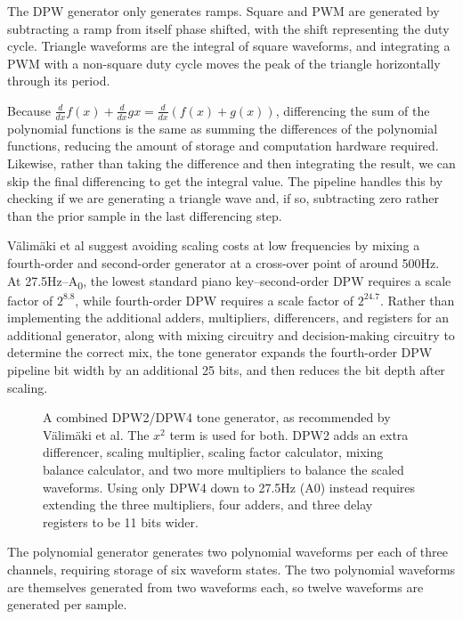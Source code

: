 The DPW generator only generates ramps.  Square and PWM are generated by subtracting a ramp from itself phase shifted, with the shift representing the duty cycle.  Triangle waveforms are the integral of square waveforms, and integrating a PWM with a non-square duty cycle moves the peak of the triangle horizontally through its period.

Because $\frac{d}{dx}f(x)+\frac{d}{dx}g{x}=\frac{d}{dx}(f(x)+g(x))$, differencing the sum of the polynomial functions is the same as summing the differences of the polynomial functions, reducing the amount of storage and computation hardware required.  Likewise, rather than taking the difference and then integrating the result, we can skip the final differencing to get the integral value.  The pipeline handles this by checking if we are generating a triangle wave and, if so, subtracting zero rather than the prior sample in the last differencing step.

Välimäki et al suggest avoiding scaling costs at low frequencies by mixing a fourth-order and second-order generator at a cross-over point of around 500Hz\autocite{Valimaki2010}.  At 27.5Hz--A\textsubscript{0}, the lowest standard piano key--second-order DPW requires a scale factor of $2^{8.8}$, while fourth-order DPW requires a scale factor of $2^{24.7}$.  Rather than implementing the additional adders, multipliers, differencers, and registers for an additional generator, along with mixing circuitry and decision-making circuitry to determine the correct mix, the tone generator expands the fourth-order DPW pipeline bit width by an additional 25 bits, and then reduces the bit depth after scaling.

\begin{figure}[h!t]
	\centering
	
	\caption{A combined DPW2/DPW4 tone generator, as recommended by Välimäki et al.  The $x^2$ term is used for both.  DPW2 adds an extra differencer, scaling multiplier, scaling factor calculator, mixing balance calculator, and two more multipliers to balance the scaled waveforms.  Using only DPW4 down to 27.5Hz (A0) instead requires extending the three multipliers, four adders, and three delay registers to be 11 bits wider.}
\end{figure}

The polynomial generator generates two polynomial waveforms per each of three channels, requiring storage of six waveform states.  The two polynomial waveforms are themselves generated from two waveforms each, so twelve waveforms are generated per sample.

